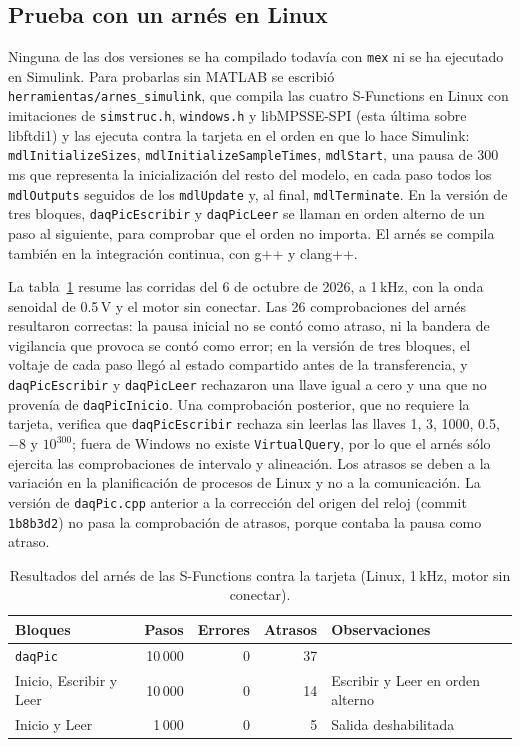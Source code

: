 \documentclass[11pt]{article}
\newcommand{\code}[1]{\texttt{#1}}
\begin{document}
\subsection{Prueba con un arnés en Linux}

Ninguna de las dos versiones se ha compilado todavía con \code{mex} ni se ha
ejecutado en Simulink. Para probarlas sin MATLAB se escribió
\code{herramientas/arnes\_simulink}, que compila las cuatro S-Functions en
Linux con imitaciones de \code{simstruc.h}, \code{windows.h} y
libMPSSE-SPI (esta última sobre libftdi1) y las ejecuta contra la tarjeta
en el orden en que lo hace Simulink: \code{mdlInitializeSizes},
\code{mdlInitializeSampleTimes}, \code{mdlStart}, una pausa de 300\,ms que
representa la inicialización del resto del modelo, en cada paso todos los
\code{mdlOutputs} seguidos de los \code{mdlUpdate} y, al final,
\code{mdlTerminate}. En la versión de tres bloques, \code{daqPicEscribir} y
\code{daqPicLeer} se llaman en orden alterno de un paso al siguiente, para
comprobar que el orden no importa. El arnés se compila también en la
integración continua, con g++ y clang++.

La tabla~\ref{tab:arnes} resume las corridas del 6 de octubre de 2026, a
1\,kHz, con la onda senoidal de 0.5\,V y el motor sin conectar. Las 26
comprobaciones del arnés resultaron correctas: la pausa inicial no se contó
como atraso, ni la bandera de vigilancia que provoca se contó como error; en
la versión de tres bloques, el voltaje de cada paso llegó al estado
compartido antes de la transferencia, y \code{daqPicEscribir} y
\code{daqPicLeer} rechazaron una llave igual a cero y una que no provenía de
\code{daqPicInicio}. Una comprobación posterior, que no requiere la tarjeta,
verifica que \code{daqPicEscribir} rechaza sin leerlas las llaves 1, 3,
1000, 0.5, $-8$ y $10^{300}$; fuera de Windows no existe
\code{VirtualQuery}, por lo que el arnés sólo ejercita las comprobaciones de
intervalo y alineación. Los atrasos se deben a la variación en la planificación
de procesos de Linux y no a la comunicación. La versión de \code{daqPic.cpp}
anterior a la corrección del origen del reloj (commit \code{1b8b3d2}) no pasa
la comprobación de atrasos, porque contaba la pausa como atraso.

\begin{table}[H]
\centering
\small
\begin{tabularx}{\linewidth}{@{}lrrrX@{}}
\toprule
Bloques & Pasos & Errores & Atrasos & Observaciones \\
\midrule
\code{daqPic} & 10\,000 & 0 & 37 & \\
Inicio, Escribir y Leer & 10\,000 & 0 & 14 & Escribir y Leer en orden alterno \\
Inicio y Leer & 1\,000 & 0 & 5 & Salida deshabilitada \\
\bottomrule
\end{tabularx}
\caption{Resultados del arnés de las S-Functions contra la tarjeta (Linux,
1\,kHz, motor sin conectar).}
\label{tab:arnes}
\end{table}
\end{document}
